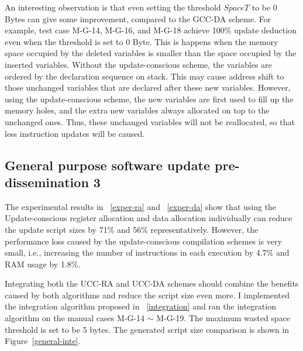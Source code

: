 An interesting observation is that even setting the threshold $SpaceT$ to be 0 Bytes can 
give some improvement, compared to the GCC-DA scheme. 
For example, test case M-G-14, M-G-16, and M-G-18 achieve 100\% update deduction
even when the threshold is set to 0 Byte.
This is happens when the memory space occupied by the deleted variables is smaller
than the space occupied by the inserted variables. 
Without the update-conscious scheme, the variables are ordered by the declaration 
sequence on stack. This may cause address shift to those unchanged variables
that are declared after these new variables. However, using the update-conscious scheme,
the new variables are first used to fill up the memory holes, and the extra new variables always 
allocated on top to the unchanged ones. Thus, these
unchanged variables will not be reallocated, so that less instruction updates will be
caused.

\subsection{General purpose software update pre-dissemination 3}

The experimental results in ~\ref{exper-ra} and ~\ref{exper-da} show that
using the Update-conscious register allocation and data allocation individually
can reduce the update script sizes by 71\% and 56\% representatively.
However, the performance loss caused by the update-conscious compilation schemes 
is very small, i.e., increasing the number of instructions in each execution by 
4.7\% and RAM usage by 1.8\%.

Integrating both the UCC-RA and UCC-DA schemes should combine the benefits
caused by both algorithms and reduce the script size even more.
I implemented the integration algorithm proposed in ~\ref{integration} and
ran the integration algorithm on the manual cases M-G-14 $\sim$ M-G-19.
The maximum wasted space threshold is set to be 5 bytes. The generated 
script size comparison is shown in Figure~\ref{general-inte}.

